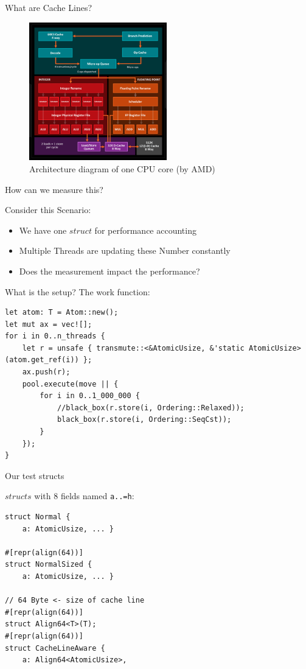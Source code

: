 \documentclass[10pt,aspectratio=169]{beamer}
\begin{document}
\begin{frame}{What are Cache Lines?}

\begin{figure}
    \includegraphics[height=6cm]{./cpu_core_architecture_diagram.png}
    \caption{Architecture diagram of one CPU core (by AMD)}
\end{figure}
\end{frame}


\begin{frame}{How can we measure this?}

    Consider this Scenario:
    \begin{itemize}
        \item We have one $struct$ for performance accounting
        \item Multiple Threads are updating these Number constantly
        \item Does the measurement impact the performance?
    \end{itemize}
\end{frame}

\begin{frame}[fragile]{What is the setup?}
The work function:
\begin{verbatim}
let atom: T = Atom::new();
let mut ax = vec![];
for i in 0..n_threads {
    let r = unsafe { transmute::<&AtomicUsize, &'static AtomicUsize>(atom.get_ref(i)) };
    ax.push(r);
    pool.execute(move || {
        for i in 0..1_000_000 {
            //black_box(r.store(i, Ordering::Relaxed));
            black_box(r.store(i, Ordering::SeqCst));
        }
    });
}
\end{verbatim}
\end{frame}

\begin{frame}[fragile]{Our test structs}

$structs$ with 8 fields named \texttt{a..=h}:

\begin{verbatim}
struct Normal {
    a: AtomicUsize, ... }

#[repr(align(64))]
struct NormalSized {
    a: AtomicUsize, ... }

// 64 Byte <- size of cache line
#[repr(align(64))]
struct Align64<T>(T);
#[repr(align(64))]
struct CacheLineAware {
    a: Align64<AtomicUsize>,
\end{verbatim}
\end{frame}
\end{document}

